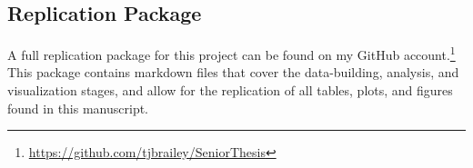 \documentclass[12pt]{article}
\begin{document}
\subsection{Replication Package}
A full replication package for this project can be found on my GitHub account.\footnote{\url{https://github.com/tjbrailey/SeniorThesis}} This package contains markdown files that cover the data-building, analysis, and visualization stages, and allow for the replication of all tables, plots, and figures found in this manuscript. 
\end{document}
